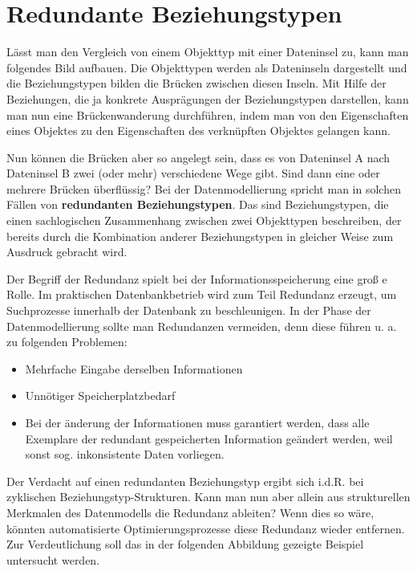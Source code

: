       \section{Redundante Beziehungstypen}
        Lässt man den Vergleich von einem Objekttyp mit einer Dateninsel zu, kann man folgendes Bild aufbauen. Die Objekttypen werden als Dateninseln dargestellt und die Beziehungstypen bilden die Brücken zwischen diesen Inseln. Mit Hilfe der Beziehungen, die ja konkrete Ausprägungen der Beziehungstypen darstellen, kann man nun eine Brückenwanderung durchführen, indem man von den Eigenschaften eines Objektes zu den Eigenschaften des verknüpften Objektes gelangen kann.

        Nun können die Brücken aber so angelegt sein, dass es von Dateninsel A nach Dateninsel B zwei (oder mehr) verschiedene Wege gibt. Sind dann eine oder mehrere Brücken überflüssig? Bei der Datenmodellierung spricht man in solchen Fällen von \textbf{redundanten Beziehungstypen}. Das sind Beziehungstypen, die einen sachlogischen Zusammenhang zwischen zwei Objekttypen beschreiben, der bereits durch die Kombination anderer Beziehungstypen in gleicher Weise zum Ausdruck gebracht wird.

        Der Begriff der Redundanz spielt bei der Informationsspeicherung eine groß e Rolle. Im praktischen Datenbankbetrieb wird zum Teil Redundanz erzeugt, um Suchprozesse innerhalb der Datenbank zu beschleunigen. In der Phase der Datenmodellierung sollte man Redundanzen vermeiden, denn diese führen u. a. zu folgenden Problemen:
\clearpage
        \begin{itemize}
          \item Mehrfache Eingabe derselben Informationen
          \item Unnötiger Speicherplatzbedarf
          \item Bei der änderung der Informationen muss garantiert werden, dass alle Exemplare der redundant gespeicherten Information geändert werden, weil sonst sog. inkonsistente Daten vorliegen.
        \end{itemize}

        Der Verdacht auf einen redundanten Beziehungstyp ergibt sich i.d.R. bei zyklischen Be\-zieh\-ungs\-typ-Struk\-turen. Kann man nun aber allein aus strukturellen Merkmalen des Datenmodells die Redundanz ableiten? Wenn dies so wäre, könnten automatisierte Optimierungsprozesse diese Redundanz wieder entfernen. Zur Verdeutlichung soll das in der folgenden Abbildung gezeigte Beispiel untersucht werden.

